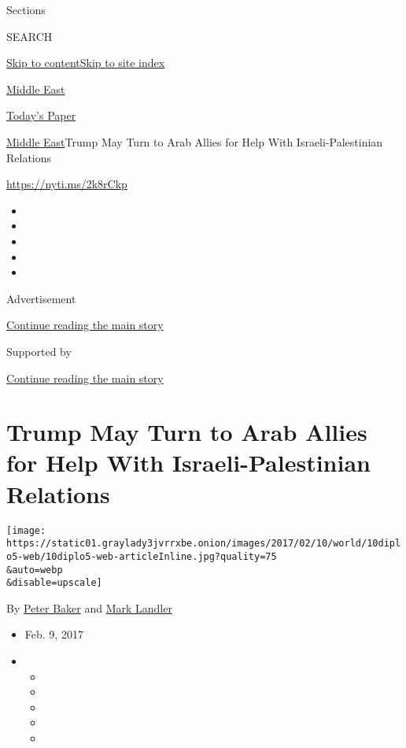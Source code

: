 Sections

SEARCH

\protect\hyperlink{site-content}{Skip to
content}\protect\hyperlink{site-index}{Skip to site index}

\href{https://www.nytimes3xbfgragh.onion/section/world/middleeast}{Middle
East}

\href{https://myaccount.nytimes3xbfgragh.onion/auth/login?response_type=cookie\&client_id=vi}{}

\href{https://www.nytimes3xbfgragh.onion/section/todayspaper}{Today's
Paper}

\href{/section/world/middleeast}{Middle East}\textbar{}Trump May Turn to
Arab Allies for Help With Israeli-Palestinian Relations

\url{https://nyti.ms/2k8rCkp}

\begin{itemize}
\item
\item
\item
\item
\item
\end{itemize}

Advertisement

\protect\hyperlink{after-top}{Continue reading the main story}

Supported by

\protect\hyperlink{after-sponsor}{Continue reading the main story}

\hypertarget{trump-may-turn-to-arab-allies-for-help-with-israeli-palestinian-relations}{%
\section{Trump May Turn to Arab Allies for Help With Israeli-Palestinian
Relations}\label{trump-may-turn-to-arab-allies-for-help-with-israeli-palestinian-relations}}

\texttt{[image: https://static01.graylady3jvrrxbe.onion/images/2017/02/10/world/10diplo5-web/10diplo5-web-articleInline.jpg?quality=75\\\&auto=webp\\\&disable=upscale]}

By \href{http://www.nytimes3xbfgragh.onion/by/peter-baker}{Peter Baker}
and \href{http://www.nytimes3xbfgragh.onion/by/mark-landler}{Mark
Landler}

\begin{itemize}
\item
  Feb. 9, 2017
\item
  \begin{itemize}
  \item
  \item
  \item
  \item
  \item
  \end{itemize}
\end{itemize}

